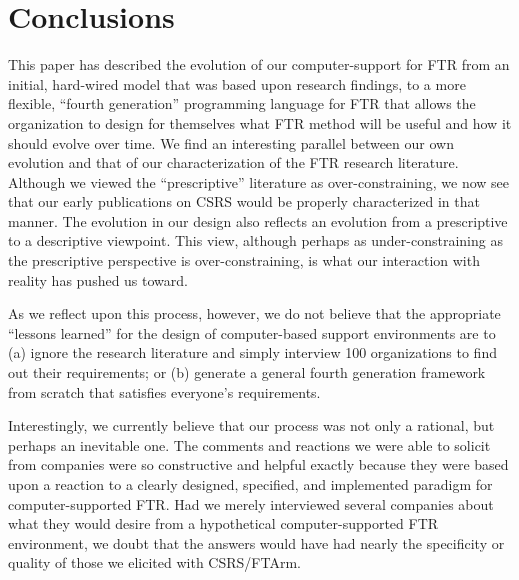 
\section{Conclusions}

This paper has described the evolution of our computer-support for FTR from
an initial, hard-wired model that was based upon research findings, to a
more flexible, ``fourth generation'' programming language for FTR that
allows the organization to design for themselves what FTR method will be
useful and how it should evolve over time.  We find an interesting parallel
between our own evolution and that of our characterization of the FTR
research literature. Although we viewed the ``prescriptive'' literature as
over-constraining, we now see that our early publications on CSRS would be
properly characterized in that manner. The evolution in our design also
reflects an evolution from a prescriptive to a descriptive viewpoint.  This
view, although perhaps as under-constraining as the prescriptive
perspective is over-constraining, is what our interaction with reality has
pushed us toward.

As we reflect upon this process, however, we do not believe that the
appropriate ``lessons learned'' for the design of computer-based support
environments are to (a) ignore the research literature and simply interview
100 organizations to find out their requirements; or (b) generate a general
fourth generation framework from scratch that satisfies everyone's
requirements.

Interestingly, we currently believe that our process was not only a
rational, but perhaps an inevitable one.  The comments and reactions we
were able to solicit from companies were so constructive and helpful
exactly because they were based upon a reaction to a clearly designed,
specified, and implemented paradigm for computer-supported FTR.  Had we
merely interviewed several companies about what they would desire from a
hypothetical computer-supported FTR environment, we doubt that the answers
would have had nearly the specificity or quality of those we elicited with
CSRS/FTArm.

